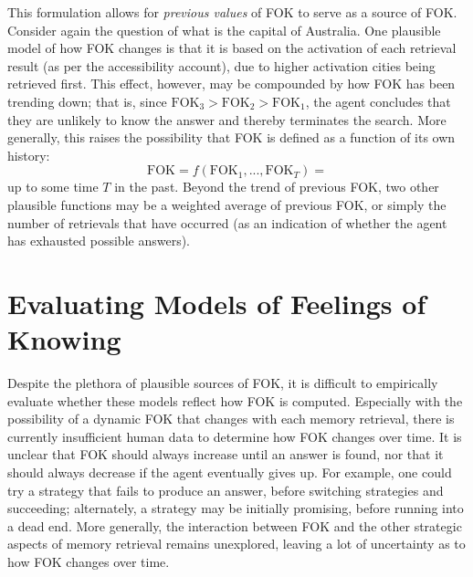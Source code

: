 \documentclass[10pt,letterpaper]{article}
\newcommand{\comment}[1]{}
\newcommand{\fok}[0]{\text{FOK}}
\begin{document}
This formulation allows for \emph{previous values} of FOK to serve as a source of FOK.
Consider again the question of what is the capital of Australia. %
One plausible model of how FOK changes is that it is based on the activation of each retrieval result (as per the accessibility account), due to higher activation cities being retrieved first.
This effect, however, may be compounded by how FOK has been trending down; that is, since $\fok_3 > \fok_2 > \fok_1$, the agent concludes that they are unlikely to know the answer and thereby terminates the search.
More generally, this raises the possibility that FOK is defined as a function of its own history:
$$\fok = f(\fok_1, ..., \fok_T) = $$
up to some time $T$ in the past.
Beyond the trend of previous FOK, two other plausible functions may be a weighted average of previous FOK, or simply the number of retrievals that have occurred (as an indication of whether the agent has exhausted possible answers).


\comment{
    mathematical pitfalls
        repeated retrievals will boost activation; 
    the impact of "unrelated" retrievals/inferences
    any modeling issues?
}


\section{Evaluating Models of Feelings of Knowing}

% 
Despite the plethora of plausible sources of FOK, it is difficult to empirically evaluate whether these models reflect how FOK is computed.
Especially with the possibility of a dynamic FOK that changes with each memory retrieval, there is currently insufficient human data to determine how FOK changes over time.
It is unclear that FOK should always increase until an answer is found, nor that it should always decrease if the agent eventually gives up.
For example, one could try a strategy that fails to produce an answer, before switching strategies and succeeding; alternately, a strategy may be initially promising, before running into a dead end.
More generally, the interaction between FOK and the other strategic aspects of memory retrieval remains unexplored, leaving a lot of uncertainty as to how FOK changes over time.
\end{document}
